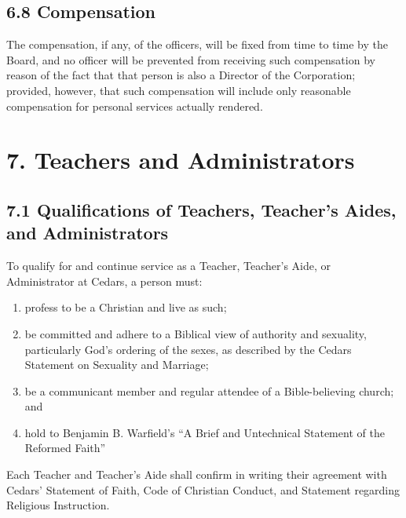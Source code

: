 \documentclass[
]{book}
\providecommand{\tightlist}{%
  \setlength{\itemsep}{0pt}\setlength{\parskip}{0pt}}
\begin{document}
\subsection*{6.8 Compensation}\label{compensation}

The compensation, if any, of the officers, will be fixed from time to time by the Board, and no officer will be prevented from receiving such compensation by reason of the fact that that person is also a Director of the Corporation; provided, however, that such compensation will include only reasonable compensation for personal services actually rendered.

\section*{7. Teachers and Administrators}\label{teachers-and-administrators}

\subsection*{7.1 Qualifications of Teachers, Teacher's Aides, and Administrators}\label{qualifications-of-teachers-teachers-aides-and-administrators}

To qualify for and continue service as a Teacher, Teacher's Aide, or Administrator at Cedars, a person must:

\begin{enumerate}
\def\labelenumi{\alph{enumi}.}
\tightlist
\item
  profess to be a Christian and live as such;
\item
  be committed and adhere to a Biblical view of authority and sexuality, particularly God's ordering of the sexes, as described by the Cedars Statement on Sexuality and Marriage;
\item
  be a communicant member and regular attendee of a Bible-believing church; and
\item
  hold to Benjamin B. Warfield's ``A Brief and Untechnical Statement of the Reformed Faith''
\end{enumerate}

Each Teacher and Teacher's Aide shall confirm in writing their agreement with Cedars' Statement of Faith, Code of Christian Conduct, and Statement regarding Religious Instruction.
\end{document}
